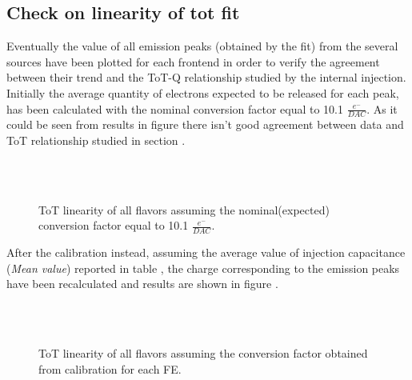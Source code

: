 

\subsection{Check on linearity of tot fit}

Eventually the value of all emission peaks (obtained by the fit) from the several sources have been plotted for each frontend in order to verify the agreement between their trend and the ToT-Q relationship studied by the internal injection. \\

Initially the average quantity of electrons expected to be released for each peak, has been calculated with the nominal conversion factor equal to 10.1 $\frac{e^{-}}{DAC}$. As it could be seen from results in figure  there isn't good agreement between data and ToT relationship studied in section .

\begin{figure}
\centering
{}\quad
{}\\
\quad
{}\\
\caption{ToT linearity of all flavors assuming the nominal(expected) conversion factor equal to 10.1 $\frac{e^{-}}{DAC}$.}
\label{fig:inj_cap_10}
\end{figure} 

After the calibration instead, assuming the average value of injection capacitance (\textit{Mean value}) reported in table , the charge corresponding to the emission peaks have been recalculated and results are shown in figure .

\begin{figure}[h!]
\centering
{}\quad
{}\\
\quad
{}\\
\caption{ToT linearity of all flavors assuming the conversion factor obtained from calibration for each FE.}
\label{fig:inj_cap_sources}
\end{figure} 

